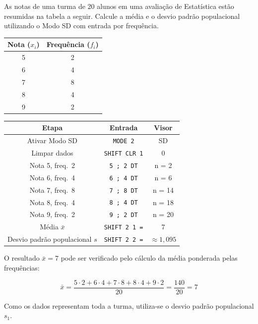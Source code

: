 As notas de uma turma de 20 alunos em uma avaliação de Estatística estão resumidas na tabela a seguir. Calcule a média e o desvio padrão populacional utilizando o Modo SD com entrada por frequência.

\begin{table}[H]
    \centering
    \begin{tabular}{|c|c|}
        \hline
        \textbf{Nota} ($x_i$) & \textbf{Frequência} ($f_i$) \\ \hline
        5 & 2 \\
        6 & 4 \\
        7 & 8 \\
        8 & 4 \\
        9 & 2 \\ \hline
    \end{tabular}
\end{table}

\begin{table}[H]
    \centering
    \begin{tabular}{|c|c|c|}
        \hline
        \textbf{Etapa} & \textbf{Entrada} & \textbf{Visor} \\ \hline
        Ativar Modo SD & \texttt{MODE 2} & SD \\
        Limpar dados & \texttt{SHIFT CLR 1} & 0 \\
        Nota 5, freq.\ 2 & \texttt{5 ; 2 DT} & n = 2 \\
        Nota 6, freq.\ 4 & \texttt{6 ; 4 DT} & n = 6 \\
        Nota 7, freq.\ 8  & \texttt{7 ; 8 DT} & n = 14 \\
        Nota 8, freq.\ 4 & \texttt{8 ; 4 DT} & n = 18 \\
        Nota 9, freq.\ 2 & \texttt{9 ; 2 DT} & n = 20 \\
        Média $\bar{x}$ & \texttt{SHIFT 2 1 =} & 7 \\
        Desvio padrão populacional $s$ & \texttt{SHIFT 2 2 =} & $\approx 1{,}095$ \\ \hline
    \end{tabular}
\end{table}

O resultado $\bar{x} = 7$ pode ser verificado pelo cálculo da média ponderada pelas frequências:

\[
    \bar{x} = \frac{5 \cdot 2 + 6 \cdot 4 + 7 \cdot 8 + 8 \cdot 4 + 9 \cdot 2}{20} = \frac{140}{20} = 7
\]

Como os dados representam toda a turma, utiliza-se o desvio padrão populacional $s_1$.

